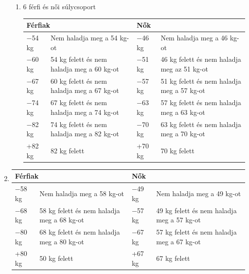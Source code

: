 \documentclass[]{report}
\begin{document}
\begin{enumerate}
\begin{enumerate}
  \item 6 férfi és női súlycsoport
    \begin{center}
    \begin{tabular}{ |l|l|l|l| }
     \hline
     \multicolumn{2}{|l|}{Férfiak} & \multicolumn{2}{l|}{Nők} \\
     \hline
     $-$54 kg & Nem haladja meg a 54 kg-ot & $-$46 kg & Nem haladja meg a 46 kg-ot \\
     \hline
     $-$60 kg & 54 kg felett és nem haladja meg a 60 kg-ot & $-$51 kg & 46 kg felett és nem haladja meg az 51 kg-ot \\
     \hline
     $-$67 kg & 60 kg felett és nem haladja meg a 67 kg-ot & $-$57 kg & 51 kg felett és nem haladja meg a 57 kg-ot \\
     \hline
     $-$74 kg & 67 kg felett és nem haladja meg a 74 kg-ot & $-$63 kg & 57 kg felett és nem haladja meg a 63 kg-ot \\
     \hline
     $-$82 kg & 74 kg felett és nem haladja meg a 82 kg-ot & $-$70 kg & 63 kg felett és nem haladja meg a 70 kg-ot \\
     \hline
     +82 kg & 82 kg felett & +70 kg & 70 kg felett \\
     \hline
    \end{tabular}
    \end{center}
  \end{enumerate}

\item


\begin{center}
\begin{tabular}{ |l|l|l|l| }
 \hline
 \multicolumn{2}{|l|}{Férfiak} & \multicolumn{2}{l|}{Nők} \\
 \hline
 $-$58 kg & Nem haladja meg a 58 kg-ot & $-$49 kg & Nem haladja meg a 49 kg-ot \\
 \hline
 $-$68 kg & 58 kg felett és nem haladja meg a 68 kg-ot & $-$57 kg & 49 kg felett és nem haladja meg a 57 kg-ot \\
 \hline
 $-$80 kg & 68 kg felett és nem haladja meg a 80 kg-ot & $-$67 kg & 57 kg felett és nem haladja meg a 67 kg-ot \\
 \hline
 +80 kg & 50 kg felett & +67 kg & 67 kg felett \\
 \hline
\end{tabular}
\end{center}

\begin{samepage}
\item



\end{samepage}
\end{enumerate}
\end{document}
